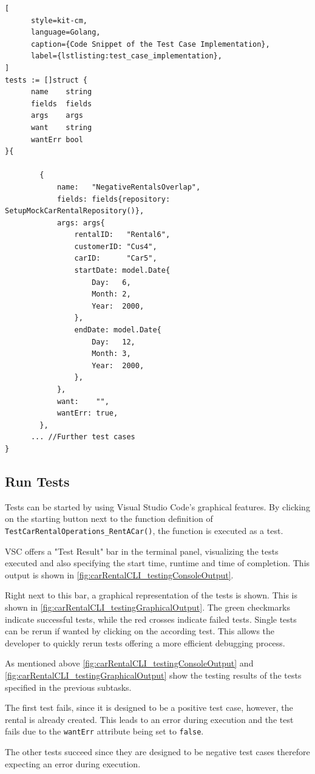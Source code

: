 \begin{lstlisting}[
      style=kit-cm,
      language=Golang,
      caption={Code Snippet of the Test Case Implementation},
      label={lstlisting:test_case_implementation},
]
tests := []struct {
      name    string
      fields  fields
      args    args
      want    string
      wantErr bool
}{
      
		{
			name:   "NegativeRentalsOverlap",
			fields: fields{repository: SetupMockCarRentalRepository()},
			args: args{
				rentalID:   "Rental6",
				customerID: "Cus4",
				carID:      "Car5",
				startDate: model.Date{
					Day:   6,
					Month: 2,
					Year:  2000,
				},
				endDate: model.Date{
					Day:   12,
					Month: 3,
					Year:  2000,
				},
			},
			want:    "",
			wantErr: true,
		},
      ... //Further test cases
}
\end{lstlisting}

\subsection*{Run Tests}
Tests can be started by using Visual Studio Code's graphical features.
By clicking on the starting button next to the function definition of \texttt{TestCarRentalOperations\_RentACar()}, the function is executed as a test.

VSC offers a "Test Result" bar in the terminal panel, visualizing the tests executed and also specifying the start time, runtime and time of completion.
This output is shown in \autoref{fig:carRentalCLI_testingConsoleOutput}.

Right next to this bar, a graphical representation of the tests is shown.
This is shown in \autoref{fig:carRentalCLI_testingGraphicalOutput}.
The green checkmarks indicate successful tests, while the red crosses indicate failed tests.
Single tests can be rerun if wanted by clicking on the according test.
This allows the developer to quickly rerun tests offering a more efficient debugging process.

As mentioned above \autoref{fig:carRentalCLI_testingConsoleOutput} and \autoref{fig:carRentalCLI_testingGraphicalOutput} show the testing results of the tests specified in the previous subtasks.

The first test fails, since it is designed to be a positive test case, however, the rental is already created.
This leads to an error during execution and the test fails due to the \texttt{wantErr} attribute being set to \texttt{false}.

The other tests succeed since they are designed to be negative test cases therefore expecting an error during execution.

